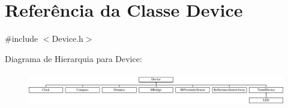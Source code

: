 \hypertarget{classDevice}{\section{Referência da Classe Device}
\label{classDevice}
}


{\ttfamily \#include $<$Device.\-h$>$}

Diagrama de Hierarquia para Device\-:\begin{figure}[H]
\begin{center}
\leavevmode
\includegraphics[height=1.500000cm]{classDevice}
\end{center}
\end{figure}
